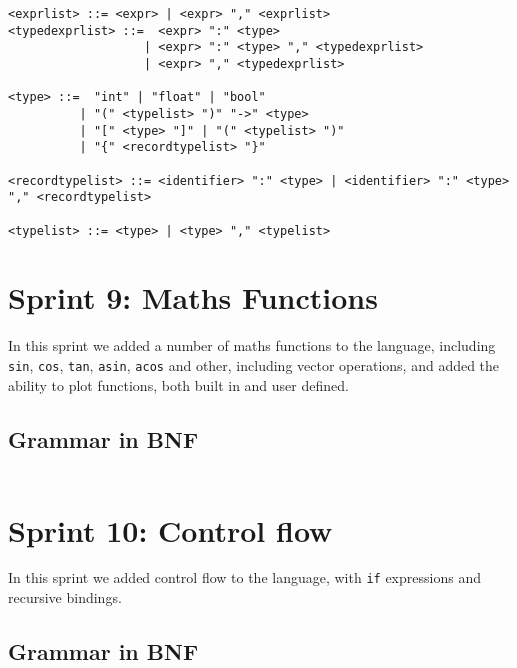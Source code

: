 \begin{verbatim}
<exprlist> ::= <expr> | <expr> "," <exprlist>
<typedexprlist> ::=  <expr> ":" <type> 
                   | <expr> ":" <type> "," <typedexprlist>
                   | <expr> "," <typedexprlist>
    
<type> ::=  "int" | "float" | "bool" 
          | "(" <typelist> ")" "->" <type> 
          | "[" <type> "]" | "(" <typelist> ")"
          | "{" <recordtypelist> "}"
          
<recordtypelist> ::= <identifier> ":" <type> | <identifier> ":" <type> "," <recordtypelist>

<typelist> ::= <type> | <type> "," <typelist>
\end{verbatim}

\section{Sprint 9: Maths Functions}\label{sec:maths-funcs}

In this sprint we added a number of maths functions to the language, including \texttt{sin}, \texttt{cos}, \texttt{tan},
\texttt{asin}, \texttt{acos} and other, including vector operations, and added the ability to plot functions, both 
built in and user defined.

\subsection{Grammar in BNF}\label{subsec:grammar-in-bnf9}

\begin{verbatim}
\end{verbatim}

\section{Sprint 10: Control flow}\label{sec:control-flow}

In this sprint we added control flow to the language, with \texttt{if} expressions and recursive bindings.

\subsection{Grammar in BNF}\label{subsec:grammar-in-bnf10}

